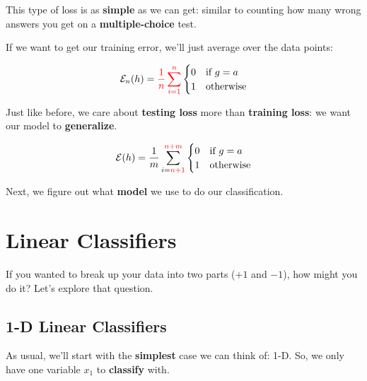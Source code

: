        This type of loss is as \textbf{simple} as we can get: similar to counting how many wrong answers you get on a \textbf{multiple-choice} test.
        
        If we want to get our training error, we'll just average over the data points:
        
        \begin{equation*}
            \mathcal{E}_n(h) = 
            \textcolor{red}{
                \frac{1}{n} \sum_{i=1}^n
            }
            \begin{cases}
                 0 & \text{if $g = a$} \\
                 1 & \text{otherwise}
            \end{cases}
        \end{equation*}
        
        Just like before, we care about \textbf{testing loss} more than \textbf{training loss}: we want our model to \textbf{generalize}.
        
        \begin{equation*}
            \mathcal{E}(h) = 
            \frac{1}{m} \sum_{i=\textcolor{red}{n+1} }^ {\textcolor{red}{n+m} }
            \begin{cases}
                 0 & \text{if $g = a$} \\
                 1 & \text{otherwise}
            \end{cases}
        \end{equation*}
        
        Next, we figure out what \textbf{model} we use to do our classification.
        
\pagebreak

\section{Linear Classifiers}

    If you wanted to break up your data into two parts ($+1$ and $-1$), how might you do it? Let's explore that question.
    
    \subsection{1-D Linear Classifiers}
    
        As usual, we'll start with the \textbf{simplest} case we can think of: 1-D. So, we only have one variable $x_1$ to \textbf{classify} with.
        
